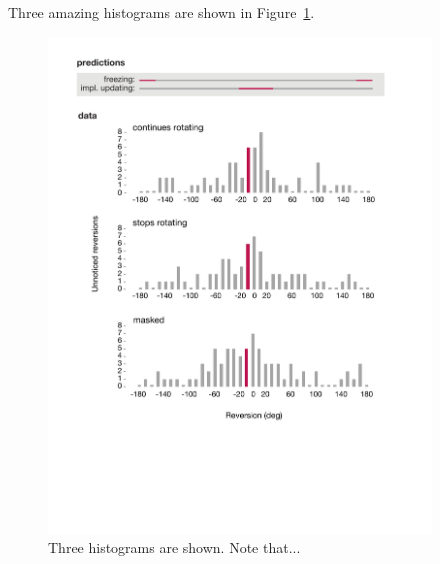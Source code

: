Three amazing histograms are shown in Figure~\ref{fig:label1}. 
\begin{figure}[htbp]
\begin{center}
\includegraphics[width=4in]{figures/fig2.pdf}
\caption{Three histograms are shown. Note that...}
\label{fig:label1}
\end{center}
\end{figure}
